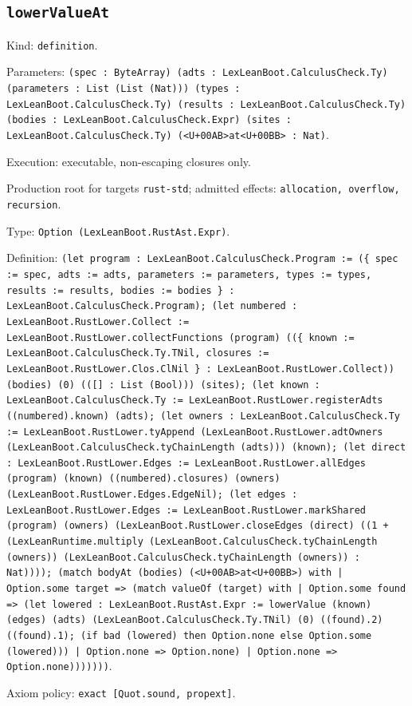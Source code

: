 \documentclass[11pt]{article}
\begin{document}
\subsection*{\texttt{lowerValueAt}}
\noindent Kind: \texttt{definition}.\par
\noindent Parameters: \texttt{(spec : ByteArray) (adts : LexLeanBoot.CalculusCheck.Ty) (parameters : List (List (Nat))) (types : LexLeanBoot.CalculusCheck.Ty) (results : LexLeanBoot.CalculusCheck.Ty) (bodies : LexLeanBoot.CalculusCheck.Expr) (sites : LexLeanBoot.CalculusCheck.Ty) (<U+00AB>at<U+00BB> : Nat)}.\par
\noindent Execution: executable, non-escaping closures only.\par
\noindent Production root for targets \texttt{rust-std}; admitted effects: \texttt{allocation, overflow, recursion}.\par
\noindent Type: \texttt{Option (LexLeanBoot.RustAst.Expr)}.\par
\noindent Definition: \texttt{(let program : LexLeanBoot.CalculusCheck.Program := (\{ spec := spec, adts := adts, parameters := parameters, types := types, results := results, bodies := bodies \} : LexLeanBoot.CalculusCheck.Program); (let numbered : LexLeanBoot.RustLower.Collect := LexLeanBoot.RustLower.collectFunctions (program) ((\{ known := LexLeanBoot.CalculusCheck.Ty.TNil, closures := LexLeanBoot.RustLower.Clos.ClNil \} : LexLeanBoot.RustLower.Collect)) (bodies) (0) (([] : List (Bool))) (sites); (let known : LexLeanBoot.CalculusCheck.Ty := LexLeanBoot.RustLower.registerAdts ((numbered).known) (adts); (let owners : LexLeanBoot.CalculusCheck.Ty := LexLeanBoot.RustLower.tyAppend (LexLeanBoot.RustLower.adtOwners (LexLeanBoot.CalculusCheck.tyChainLength (adts))) (known); (let direct : LexLeanBoot.RustLower.Edges := LexLeanBoot.RustLower.allEdges (program) (known) ((numbered).closures) (owners) (LexLeanBoot.RustLower.Edges.EdgeNil); (let edges : LexLeanBoot.RustLower.Edges := LexLeanBoot.RustLower.markShared (program) (owners) (LexLeanBoot.RustLower.closeEdges (direct) ((1 + (LexLeanRuntime.multiply (LexLeanBoot.CalculusCheck.tyChainLength (owners)) (LexLeanBoot.CalculusCheck.tyChainLength (owners)) : Nat)))); (match bodyAt (bodies) (<U+00AB>at<U+00BB>) with | Option.some target => (match valueOf (target) with | Option.some found => (let lowered : LexLeanBoot.RustAst.Expr := lowerValue (known) (edges) (adts) (LexLeanBoot.CalculusCheck.Ty.TNil) (0) ((found).2) ((found).1); (if bad (lowered) then Option.none else Option.some (lowered))) | Option.none => Option.none) | Option.none => Option.none)))))))}.\par
\noindent Axiom policy: \texttt{exact [Quot.sound, propext]}.\par
\end{document}
